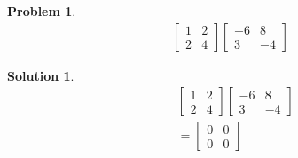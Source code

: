 \documentclass{article}
\newtheorem{problem}{Problem}
\newtheorem*{solution}{Solution}
\begin{document}
\begin{problem}
\begin{align*}
\begin{bmatrix}
1 & 2 \\ 2 & 4
\end{bmatrix} 
\begin{bmatrix}
-6 & 8 \\ 3 & -4
\end{bmatrix}
\end{align*}
\end{problem}

\begin{solution}
\begin{align*}
& \begin{bmatrix}
1 & 2 \\ 2 & 4
\end{bmatrix} 
\begin{bmatrix}
-6 & 8 \\ 3 & -4
\end{bmatrix} \\
&= \begin{bmatrix}
0 & 0 \\ 0 & 0
\end{bmatrix}
\end{align*}
\end{solution}
\end{document}
